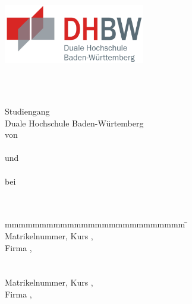 \begin{titlepage}
	\begin{center}
		\includegraphics[height=2.6cm]{images/dhbw.png}
	\end{center}
	\enlargethispage{20mm}
	\begin{center}
	  \begin{spacing}{2}
	  \vspace*{9mm}	{\Large\bf \titel }\\
	  \end{spacing}
	  \vspace*{8mm}	{\large\bf \arbeit}\\

	  \vspace*{17mm}	Studiengang \studiengang\\
	  \vspace*{3mm} 	Duale Hochschule Baden-Würtemberg \dhbw\\
	  \vspace*{12mm}	von\\
	  \vspace*{3mm} 	{\large\bf \autorA}\\
	  \vspace*{3mm} 	{und}\\
	  \vspace*{3mm} 	{\large\bf \autorB}\\
	  \vspace*{3mm} 	{bei}\\
	  \vspace*{3mm}		{\textbf{\betreuer}}\\
	  \vspace*{12mm}	\datumAbgabe\\
	\end{center}
	\vfill
	\begin{spacing}{1.2}
	\begin{tabbing}
		mmmmmmmmmmmmmmmmmmmmmmmmmm     \= \kill
		\textbf{\autorA}\\
		Matrikelnummer, Kurs  \>  \matrikelnrA, \kurs\\
		Firma      \>  \firmaA, \firmenortA\\
		\\
		\textbf{\autorB}\\
		Matrikelnummer, Kurs  \>  \matrikelnrB, \kurs\\
		Firma      \>  \firmaB, \firmenortB\\
		
		
	\end{tabbing}
	\end{spacing}
\end{titlepage}
